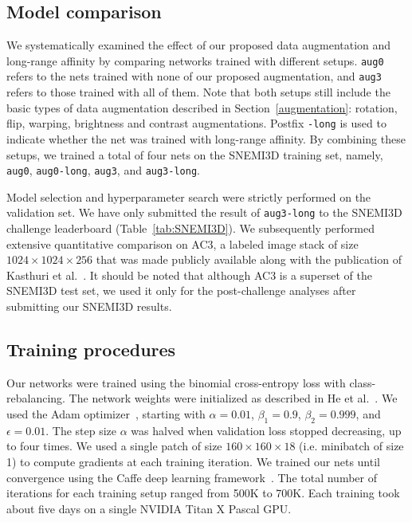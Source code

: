 \documentclass{article}
\begin{document}
\subsection{Model comparison}

We systematically examined the effect of our proposed data augmentation and
long-range affinity by comparing networks trained with different setups.
\texttt{aug0} refers to the nets trained with none of our proposed augmentation,
and \texttt{aug3} refers to those trained with all of them. Note that both
setups still include the basic types of data augmentation described in
Section~\ref{augmentation}: rotation, flip, warping, brightness and contrast
augmentations. Postfix \texttt{-long} is used to indicate whether the net was
trained with long-range affinity. By combining these setups, we
trained a total of four nets on the SNEMI3D training set, namely, \texttt{aug0},
\texttt{aug0-long}, \texttt{aug3}, and \texttt{aug3-long}.

Model selection and hyperparameter search were strictly performed on the
validation set. We have only submitted the result of \texttt{aug3-long} to the
SNEMI3D challenge leaderboard (Table~\ref{tab:SNEMI3D}). We subsequently
performed extensive quantitative comparison on AC3, a labeled image stack of
size $1024\times1024\times256$ that was made publicly available along with the
publication of Kasthuri et al.~\cite{kasthuri2015}. It should be noted that
although AC3 is a superset of the SNEMI3D test set, we used it only for the
post-challenge analyses after submitting our SNEMI3D results.

\subsection{Training procedures}

Our networks were trained using the binomial cross-entropy loss with
class-rebalancing. The network weights were initialized as described in He et
al.~\cite{he2015a}. We used the Adam optimizer~\cite{kingma2014}, starting with
$\alpha=0.01$, $\beta_1=0.9$, $\beta_2=0.999$, and $\epsilon=0.01$. The step
size $\alpha$ was halved when validation loss stopped decreasing, up to four
times. We used a single patch of size $160\times160\times18$ (i.e. minibatch of
size 1) to compute gradients at each training iteration. We trained our nets
until convergence using the Caffe deep learning framework~\cite{jia2014caffe}.
The total number of iterations for each training setup ranged from 500K to 700K.
Each training took about five days on a single NVIDIA Titan X Pascal GPU.
\end{document}
